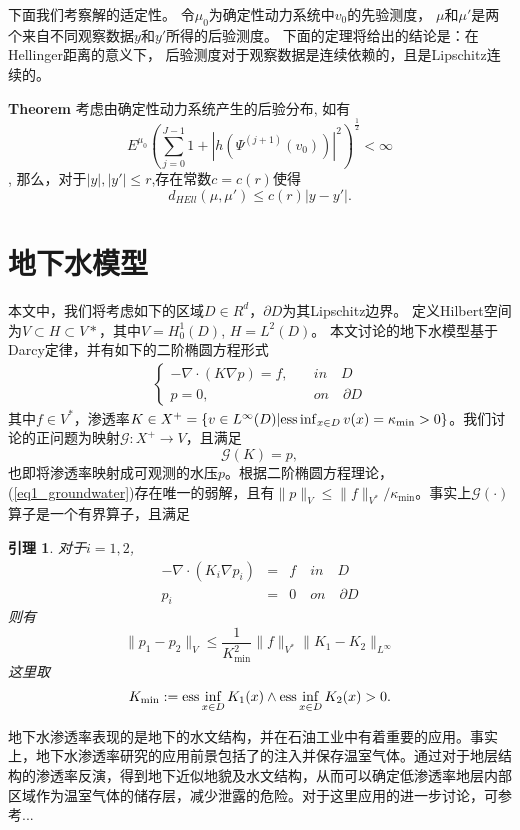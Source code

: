 \documentclass[a4paper,12pt,oneside,CJK]{cctbook}
\newtheorem{lem}  {\indent 引理}[section]
\theoremstyle{definition}
\numberwithin{equation}{section}
\begin{document}
下面我们考察解的适定性。
令$\mu_0$为确定性动力系统中$v_0$的先验测度，
$\mu$和$\mu'$是两个来自不同观察数据$y$和$y'$所得的后验测度。
下面的定理将给出的结论是：在Hellinger距离的意义下，
后验测度对于观察数据是连续依赖的，且是Lipschitz连续的。

\textbf{Theorem}
考虑由确定性动力系统产生的后验分布,
如有$$E^{\mu_0}(\sum_{j=0}^{J-1}1+|h(\Psi^{(j+1)}(v_0))|^2)^{\frac{1}{2}}< \infty$$,
那么，对于$|y|,|y'|\leq r$,存在常数$c=c(r)$使得
$$d_{HEll}(\mu,\mu')\leq c(r)|y-y'|.$$









\section{地下水模型}
本文中，我们将考虑如下的区域$D\in R^d$，$\partial D$为其Lipschitz边界。
定义Hilbert空间为$V\subset H \subset V*$，其中$V = H_0^1(D)$, $H=L^2(D)$。
本文讨论的地下水模型基于Darcy定律，并有如下的二阶椭圆方程形式
\begin{align}\label{eq1_groundwater}
\left\{
\begin{array}{rl}
    -\nabla\cdot(K\nabla p)=f,  & \quad in\quad D\\
     p=0, & \quad on \quad \partial D
\end{array}
\right.
\end{align}
其中$f\in V^*$，渗透率$K\in X^+ = \{v\in L^{\infty}(D)|{\rm ess} \inf_{x\in D} v(x) = \kappa_{\min}>0\}$。我们讨论的正问题为映射$\mathcal{G}:X^+\rightarrow V$，且满足
$$\mathcal{G}(K)=p,$$
也即将渗透率映射成可观测的水压$p$。根据二阶椭圆方程理论，(\ref{eq1_groundwater})存在唯一的弱解，且有$\|p\|_V \leq \|f\|_{V^*}/\kappa_{\min}$。事实上$\mathcal{G}(\cdot)$算子是一个有界算子，且满足
\begin{lem}\label{lem_groundwater}
对于$i=1,2$,
\begin{eqnarray*}
   -\nabla\cdot(K_i\nabla p_i)&=&f \quad in\quad D\\
     p_i&=&0\quad on \quad \partial D
\end{eqnarray*}
则有
$$\|p_1-p_2\|_V\leq \frac{1}{K_{\min}^2}\|f\|_{V^*}\|K_1-K_2\|_{L^{\infty}}$$
这里取
$$K_{\min}:={\rm ess} \inf_{x\in D}K_1(x)\wedge {\rm ess} \inf_{x\in D}K_2(x)>0.$$
\end{lem}

地下水渗透率表现的是地下的水文结构，并在石油工业中有着重要的应用。事实上，地下水渗透率研究的应用前景包括了的注入并保存温室气体。通过对于地层结构的渗透率反演，得到地下近似地貌及水文结构，从而可以确定低渗透率地层内部区域作为温室气体的储存层，减少泄露的危险。对于这里应用的进一步讨论，可参考...
\end{document}

